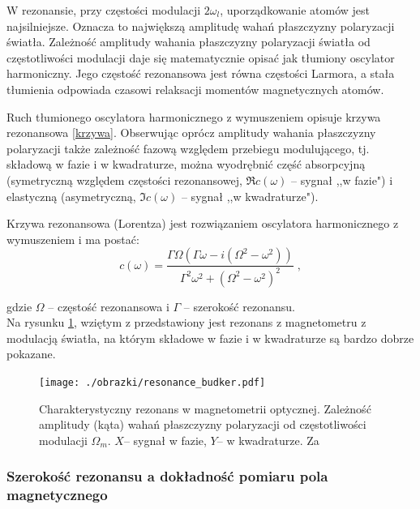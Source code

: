 \documentclass[a4paper,10pt,twoside]{report}
\begin{document}
W rezonansie, przy częstości modulacji $2 \omega_l$, uporządkowanie atomów jest najsilniejsze. Oznacza to największą amplitudę wahań płaszczyzny polaryzacji światła. Zależność amplitudy wahania płaszczyzny polaryzacji światła
od częstotliwości modulacji daje się matematycznie opisać jak tłumiony oscylator harmoniczny. Jego częstość rezonansowa jest  równa częstości Larmora, a stała tłumienia odpowiada czasowi relaksacji momentów magnetycznych atomów. 

Ruch tłumionego oscylatora harmonicznego z wymuszeniem opisuje
 krzywa rezonansowa \ref{krzywa}. Obserwując oprócz amplitudy wahania płaszczyzny polaryzacji także zależność fazową względem przebiegu modulującego, tj. składową w fazie i w kwadraturze, można wyodrębnić część absorpcyjną (symetryczną względem częstości rezonansowej, $\Re{c(\omega)}$ -- sygnał ,,w fazie") i elastyczną (asymetryczną, $\Im{c(\omega)}$ -- sygnał ,,w kwadraturze").

Krzywa rezonansowa (Lorentza) jest rozwiązaniem oscylatora harmonicznego z wymuszeniem i ma postać:
\begin{equation}
c(\omega)=\frac{\Gamma  \Omega  \left(\Gamma  \omega -i \left(\Omega ^2-\omega ^2\right)\right)}{\Gamma ^2 \omega ^2+\left(\Omega ^2-\omega ^2\right)^2} \; ,
\label{krzywa}
\end{equation}

gdzie $\Omega$ -- częstość rezonansowa i $\Gamma$ -- szerokość rezonansu.\\

Na rysunku \ref{fig:bud_res}, wziętym z \cite{budker-resonance} przedstawiony jest rezonans z magnetometru z modulacją światła, na którym składowe w fazie i w kwadraturze są bardzo dobrze pokazane.

\begin{figure}[h!]
\begin{center}
 \texttt{[image: ./obrazki/resonance\_budker.pdf]}
\end{center}
\caption{ Charakterystyczny rezonans w magnetometrii optycznej. Zależność amplitudy (kąta) wahań płaszczyzny polaryzacji od częstotliwości modulacji $\Omega_m$. $X$-- sygnał w fazie, $Y$-- w kwadraturze. Za \cite{budker-resonance}}
\label{fig:bud_res}
\end{figure}

\subsubsection{Szerokość rezonansu a dokładność pomiaru pola magnetycznego}
\end{document}
